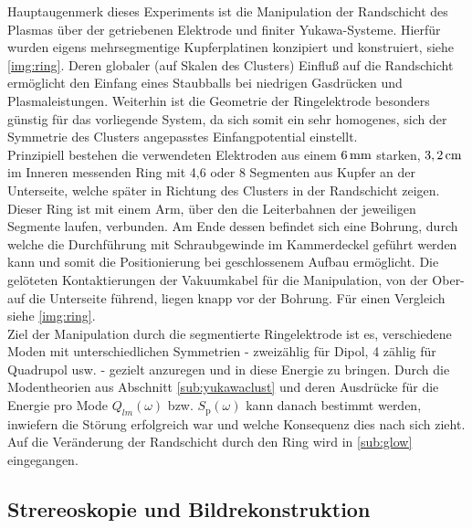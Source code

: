 \documentclass[numbers=noenddot,a4paper]{scrartcl}
\newcommand{\ix}[1]{_\text{#1}}
\begin{document}
			Hauptaugenmerk dieses Experiments ist die Manipulation der Randschicht des Plasmas \"uber der getriebenen Elektrode und finiter Yukawa-Systeme. Hierf\"ur wurden eigens mehrsegmentige Kupferplatinen konzipiert und konstruiert, siehe \ref{img:ring}. Deren globaler (auf Skalen des Clusters) Einflu{\ss} auf die Randschicht erm\"oglicht den Einfang eines Staubballs bei niedrigen Gasdr\"ucken und Plasmaleistungen. Weiterhin ist die Geometrie der Ringelektrode besonders g\"unstig f\"ur das vorliegende System, da sich somit ein sehr homogenes, sich der Symmetrie des Clusters angepasstes Einfangpotential einstellt.\\
			Prinzipiell bestehen die verwendeten Elektroden aus einem $\unit[6]{mm}$ starken, $\unit[3,2]{cm}$ im Inneren messenden Ring mit 4,6 oder 8 Segmenten aus Kupfer an der Unterseite, welche später in Richtung des Clusters in der Randschicht zeigen. Dieser Ring ist mit einem Arm, über den die Leiterbahnen der jeweiligen Segmente laufen, verbunden. Am Ende dessen befindet sich eine Bohrung, durch welche die Durchführung mit Schraubgewinde im Kammerdeckel geführt werden kann und somit die Positionierung bei geschlossenem Aufbau ermöglicht. Die gelöteten Kontaktierungen der Vakuumkabel für die Manipulation, von der Ober- auf die Unterseite führend, liegen knapp vor der Bohrung. Für einen Vergleich siehe \ref{img:ring}.\\
			Ziel der Manipulation durch die segmentierte Ringelektrode ist es, verschiedene Moden mit unterschiedlichen Symmetrien - zweizählig für Dipol, 4 zählig für Quadrupol usw. - gezielt anzuregen und in diese Energie zu bringen. Durch die Modentheorien aus Abschnitt  \ref{sub:yukawaclust} und deren Ausdrücke für die Energie pro Mode $Q_{lm}\left(\omega\right)$ bzw. $S\ix{p}\left(\omega\right)$ kann danach bestimmt werden, inwiefern die Störung erfolgreich war und welche Konsequenz dies nach sich zieht. Auf die Veränderung der Randschicht durch den Ring wird in \ref{sub:glow} eingegangen.


		\subsection{Strereoskopie und Bildrekonstruktion}
\end{document}
